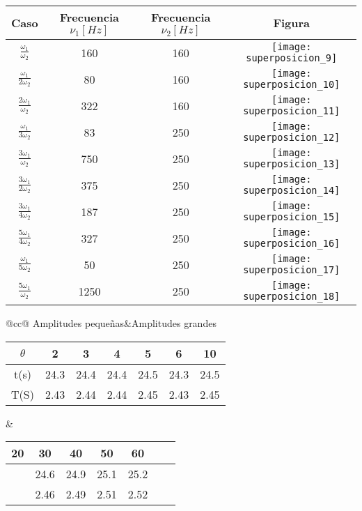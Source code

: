 \documentclass[11pt]{article}
\begin{document}
\begin{table*}
  \centering
  \begin{tabular}{@{}cccc@{}}
    \toprule
Caso&Frecuencia $\nu _1[Hz]$&	Frecuencia $\nu _2[Hz]$&Figura\\
\midrule
$\frac{\omega _1}{\omega _2}$		&	160	&	160	&	\texttt{[image: superposicion\_9]}\\
\midrule
$\frac{\omega _1}{2 \omega _2}$	&	80	&	160	&	\texttt{[image: superposicion\_10]}\\
\midrule
$\frac{ 2\omega _1}{\omega _2}$	&	322	&	160	&	\texttt{[image: superposicion\_11]}\\
\midrule
$\frac{\omega _1}{3 \omega _2}$	&	83	&	250	&	\texttt{[image: superposicion\_12]}\\
\midrule
$\frac{3 \omega _1}{\omega _2}$	&	750	&	250	&	\texttt{[image: superposicion\_13]}\\
\midrule
$\frac{3 \omega _1}{2 \omega _2}$	&	375	&	250	&	\texttt{[image: superposicion\_14]}\\
\midrule
$\frac{3 \omega _1}{4 \omega _2}$	&	187	&	250	&	\texttt{[image: superposicion\_15]}\\
\midrule
$\frac{5 \omega _1}{4 \omega _2}$	&	327	&	250	&	\texttt{[image: superposicion\_16]}\\
\midrule
$\frac{\omega _1}{5 \omega _2}$	&	50	&	250	&	\texttt{[image: superposicion\_17]}\\
\midrule
$\frac{5 \omega _1}{\omega _2}$	&	1250	&	250	&	\texttt{[image: superposicion\_18]}\\
 \bottomrule
  \end{tabular}
  \caption{}
\end{table*}

\begin{table*}
  \centering
\begin{tabular}{@{}cc@{}}
\toprule
Amplitudes pequeñas&Amplitudes grandes\\
  {\begin{tabular}{@{}ccccccc@{}}
    \toprule
 $\theta$ &	2&	3&	4&	5&	6&	10\\
\midrule
\ch t(s)&	24.3&	24.4&	24.4&	24.5&	24.3&	24.5\\
\ch T(S)&	2.43&	2.44&	2.44&	2.45&	2.43&	2.45\\
    \bottomrule
  \end{tabular}}&
{\begin{tabular}{@{}ccccccc@{}}
    \toprule
20&	30&	40&	50&	60\\
\midrule
\ch 24.7&	24.6&	24.9&	25.1&	25.2\\
\ch 2.47&	2.46&	2.49&	2.51&	2.52\\
    \bottomrule
  \end{tabular}}

\end{tabular}
  \caption{Para 1.5 metros}
\end{table*}
\end{document}

